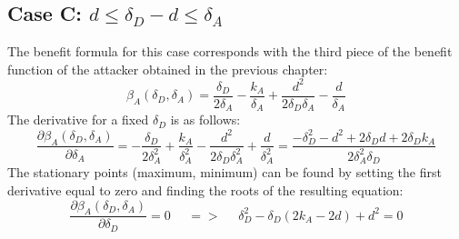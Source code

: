 %
%
%

\subsection*{Case C: $d \leq \delta_{D} -d \leq \delta_{A} $}

The benefit formula for this case corresponds with the third piece of the benefit function of the attacker obtained in the previous chapter:
\begin{equation*}
\beta_{A}(\delta_{D},\delta_{A}) =\dfrac{\delta_{D}}{2\delta_{A}} - \dfrac{k_{A}}{\delta_{A}} + \dfrac{d^{2}}{2\delta_{D}\delta_{A}} - \dfrac{d}{\delta_{A}}
\end{equation*}
The derivative for a fixed $\delta_{D}$ is as follows:
\begin{equation*}
\dfrac{\partial \beta_{A}(\delta_{D},\delta_{A})}{\partial \delta_{A}} = -\dfrac{\delta_{D}}{2\delta_{A}^{2}} + \dfrac{k_{A}}{\delta_{A}^{2}} - \dfrac{d^{2}}{2\delta_{D}\delta_{A}^{2}} + \dfrac{d}{\delta_{A}^{2}} = \dfrac{-\delta_{D}^{2} - d^{2} + 2\delta_{D}d + 2\delta_{D}k_{A}}{2\delta_{A}^{2}\delta_{D}}
\end{equation*}
The stationary points (maximum, minimum) can be found by setting the first derivative equal to zero and finding the roots of the resulting equation:
\begin{equation*}
\frac{\partial \beta_{A}(\delta_{D},\delta_{A})}{\partial \delta_{D}} =0 ~~~~~~ =>~~~~~~  \delta_{D}^{2}-\delta_{D}(2k_{A}-2d) + d^{2}= 0
\end{equation*}

